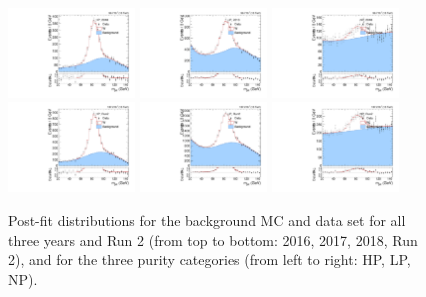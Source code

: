 \begin{figure}[htbp]
  \includegraphics[width=0.3\textwidth]{fig/analysis/PostFit__MJJ__allC_allL_HP_2018.pdf}
  \includegraphics[width=0.3\textwidth]{fig/analysis/PostFit__MJJ__allC_allL_LP_2018.pdf}
  \includegraphics[width=0.3\textwidth]{fig/analysis/PostFit__MJJ__allC_allL_NP_2018.pdf}\\
  \includegraphics[width=0.3\textwidth]{fig/analysis/PostFit__MJJ__allC_allL_HP_Run2.pdf}
  \includegraphics[width=0.3\textwidth]{fig/analysis/PostFit__MJJ__allC_allL_LP_Run2.pdf}
  \includegraphics[width=0.3\textwidth]{fig/analysis/PostFit__MJJ__allC_allL_NP_Run2.pdf}\\
  \caption{
    Post-fit distributions for the background MC and data set for all three years and Run 2 (from top to bottom: 2016, 2017, 2018, Run 2), and for the three purity categories (from left to right: HP, LP, NP).
  }
  \label{fig:VTag_postfit_Run2}
\end{figure}

